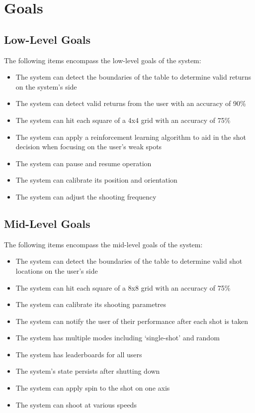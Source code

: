 \documentclass[11pt]{article}
\begin{document}
\section{Goals}
\subsection{Low-Level Goals}
The following items encompass the low-level goals of the system:
\begin{itemize}
\item The system can detect the boundaries of the table to determine valid returns on the system's side
\item The system can detect valid returns from the user with an accuracy of 90\%
\item The system can hit each square of a 4x4 grid with an accuracy of 75\%
\item The system can apply a reinforcement learning algorithm to aid in the shot decision when focusing on the user's weak spots
\item The system can pause and resume operation
\item The system can calibrate its position and orientation
\item The system can adjust the shooting frequency
\end{itemize}
\subsection{Mid-Level Goals}
The following items encompass the mid-level goals of the system:
\begin{itemize}
\item The system can detect the boundaries of the table to determine valid shot locations on the user's side
\item The system can hit each square of a 8x8 grid with an accuracy of 75\%
\item The system can calibrate its shooting parametres
\item The system can notify the user of their performance after each shot is taken
\item The system has multiple modes including `single-shot' and random
\item The system has leaderboards for all users
\item The system's state persists after shutting down
\item The system can apply spin to the shot on one axis
\item The system can shoot at various speeds
\end{itemize}
\end{document}
